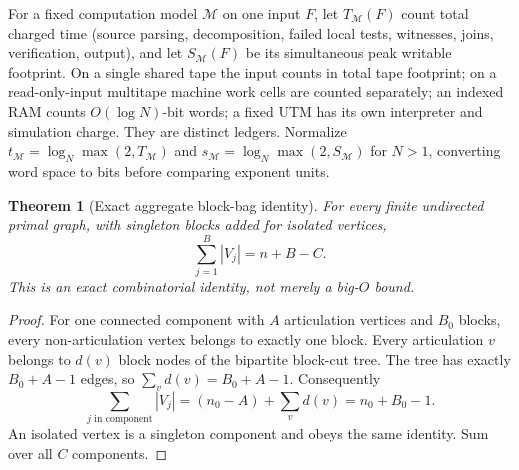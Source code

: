 \documentclass[10pt]{article}
\newtheorem{theorem}{Theorem}
\begin{document}
For a fixed computation model $\mathcal M$ on one input $F$, let $T_{\mathcal M}(F)$ count total charged time (source parsing, decomposition, failed local tests, witnesses, joins, verification, output), and let $S_{\mathcal M}(F)$ be its simultaneous peak writable footprint. On a single shared tape the input counts in total tape footprint; on a read-only-input multitape machine work cells are counted separately; an indexed RAM counts $O(\log N)$-bit words; a fixed UTM has its own interpreter and simulation charge. They are distinct ledgers. Normalize $t_{\mathcal M}=\log_N\max(2,T_{\mathcal M})$ and $s_{\mathcal M}=\log_N\max(2,S_{\mathcal M})$ for $N>1$, converting word space to bits before comparing exponent units.

\begin{theorem}[Exact aggregate block-bag identity]\label{th:identity}
For every finite undirected primal graph, with singleton blocks added for isolated vertices,
\[
\boxed{\sum_{j=1}^{B}|V_j|=n+B-C.}\tag{1}
\]
This is an exact combinatorial identity, not merely a big-$O$ bound.
\end{theorem}
\begin{proof}
For one connected component with $A$ articulation vertices and $B_0$ blocks, every non-articulation vertex belongs to exactly one block. Every articulation $v$ belongs to $d(v)$ block nodes of the bipartite block-cut tree. The tree has exactly $B_0+A-1$ edges, so $\sum_v d(v)=B_0+A-1$. Consequently
\[
\sum_{j\text{ in component}}|V_j|=(n_0-A)+\sum_v d(v)=n_0+B_0-1.
\]
An isolated vertex is a singleton component and obeys the same identity. Sum over all $C$ components.\qedhere
\end{proof}
\end{document}

